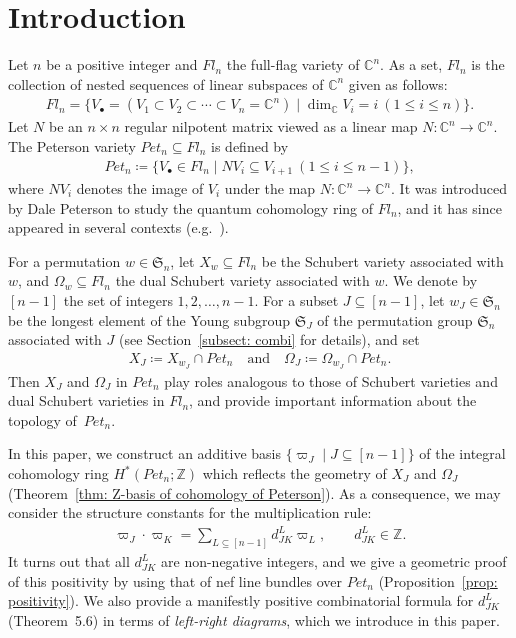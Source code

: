 \documentclass[11pt]{article}
\theoremstyle{definition}
\numberwithin{equation}{section}
\numberwithin{equation}{section}
\begin{document}
\section{Introduction}
Let $n$ be a positive integer and $Fl_n$ the full-flag variety of ${\mathbb C}^n$. As a set, $Fl_n$ is the collection of nested sequences of linear subspaces of ${\mathbb C}^n$ given as follows:
\begin{align*}
 Fl_n = \{V_{\bullet}=(V_1\subset V_2\subset \cdots \subset V_{n}={\mathbb C}^n) \mid \dim_{{\mathbb C}}V_i=i \ (1\le i\le n)\}.
\end{align*}
Let $N$ be an $n\times n$ regular nilpotent matrix viewed as a linear map $N\colon {\mathbb C}^n\rightarrow {\mathbb C}^n$. The Peterson variety $Pet_{n}\subseteq Fl_n$ is defined by
\begin{align*}
 Pet_{n} \coloneqq \{V_{\bullet} \in Fl_n \mid NV_i\subseteq V_{i+1} \ (1\le i\le n-1)\},
\end{align*}
where $NV_i$ denotes the image of $V_i$ under the map $N\colon {\mathbb C}^n\rightarrow {\mathbb C}^n$. It was introduced by Dale Peterson to study the quantum cohomology ring of $Fl_n$, and it has since appeared in several contexts (e.g.\ \cite{AHMMS,Ba,ha-ho-ma,Kostant,Rietsch06}). 

For a permutation $w\in\mathfrak{S}_n$, let $X_w\subseteq Fl_n$ be the Schubert variety associated with~$w$, and $\Omega_w\subseteq Fl_n$ the dual Schubert variety associated with $w$. We denote by~$[n-1]$ the set of integers $1,2,\ldots,n-1$. For a subset $J\subseteq[n-1]$, let $w_J\in\mathfrak{S}_n$ be the longest element of the Young subgroup $\mathfrak{S}_J$ of the permutation group $\mathfrak{S}_n$ associated with $J$ (see Section~\ref{subsect: combi} for details), and set
\begin{align*}
X_{J} 
\coloneqq X_{w_J}\cap Pet_{n} \quad \text{and} \quad \Omega_{J} 
\coloneqq \Omega_{w_J}\cap Pet_{n}.
\end{align*}
Then $X_J$ and $\Omega_J$ in $Pet_{n}$ play roles analogous to those of Schubert varieties and dual Schubert varieties in $Fl_n$, and provide important information about the topology of~$Pet_{n}$.

In this paper, we construct an additive basis $\{\varpi_J\mid J\subseteq[n-1]\}$ of the integral cohomology ring $H^*(Pet_{n};{\mathbb Z})$ which reflects the geometry of $X_J$ and $\Omega_J$ (Theorem~\ref{thm: Z-basis of cohomology of Peterson}). As a consequence, we may consider the structure constants for the multiplication rule:
\begin{align}\label{intro:100}
 \varpi_J\cdot \varpi_K = \sum_{L\subseteq[n-1]} d_{JK}^L \varpi_L , \qquad d_{JK}^L\in {\mathbb Z}.
\end{align}
It turns out that all $d_{JK}^L$ are non-negative integers, and we give a geometric proof of this positivity by using that of nef line bundles over $Pet_{n}$ (Proposition~\ref{prop: positivity}). We also provide a manifestly positive combinatorial formula for $d_{JK}^L$ (Theorem~5.6) in terms of \textit{left-right diagrams}, which we introduce in this paper. 
\end{document}
